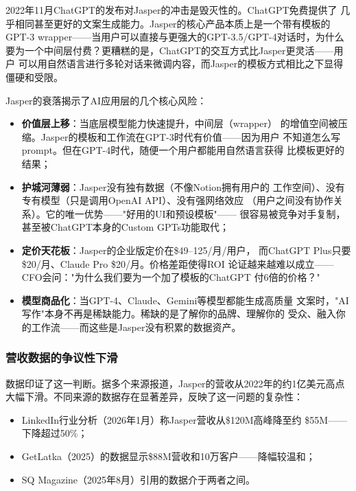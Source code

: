 2022年11月ChatGPT的发布对Jasper的冲击是毁灭性的。ChatGPT免费提供了
几乎相同甚至更好的文案生成能力。Jasper的核心产品本质上是一个带有模板的
GPT-3 wrapper——当用户可以直接与更强大的GPT-3.5/GPT-4对话时，为什么
要为一个中间层付费？更糟糕的是，ChatGPT的交互方式比Jasper更灵活——用户
可以用自然语言进行多轮对话来微调内容，而Jasper的模板方式相比之下显得
僵硬和受限。

\begin{warnbox}
Jasper的衰落揭示了AI应用层的几个核心风险：
\begin{itemize}
  \item \textbf{价值层上移}：当底层模型能力快速提升，中间层（wrapper）
    的增值空间被压缩。Jasper的模板和工作流在GPT-3时代有价值——因为用户
    不知道怎么写prompt。但在GPT-4时代，随便一个用户都能用自然语言获得
    比模板更好的结果；
  \item \textbf{护城河薄弱}：Jasper没有独有数据（不像Notion拥有用户的
    工作空间）、没有专有模型（只是调用OpenAI API）、没有强网络效应
    （用户之间没有协作关系）。它的唯一优势——"好用的UI和预设模板"——
    很容易被竞争对手复制，甚至被ChatGPT本身的Custom GPTs功能取代；
  \item \textbf{定价天花板}：Jasper的企业版定价在\$49--125/月/用户，
    而ChatGPT Plus只要\$20/月、Claude Pro \$20/月。价格差距使得ROI
    论证越来越难以成立——CFO会问："为什么我们要为一个加了模板的ChatGPT
    付6倍的价格？"
  \item \textbf{模型商品化}：当GPT-4、Claude、Gemini等模型都能生成高质量
    文案时，"AI写作"本身不再是稀缺能力。稀缺的是了解你的品牌、理解你的
    受众、融入你的工作流——而这些是Jasper没有积累的数据资产。
\end{itemize}
\end{warnbox}

\subsubsection{营收数据的争议性下滑}
数据印证了这一判断。据多个来源报道，Jasper的营收从2022年的约1亿美元高点
大幅下滑。不同来源的数据存在显著差异，反映了这一问题的复杂性：

\begin{itemize}
  \item LinkedIn行业分析（2026年1月）称Jasper营收从\$120M高峰降至约
    \$55M——下降超过50\%；
  \item GetLatka（2025）的数据显示\$88M营收和10万客户——降幅较温和；
  \item SQ Magazine（2025年8月）引用的数据介于两者之间。
\end{itemize}

